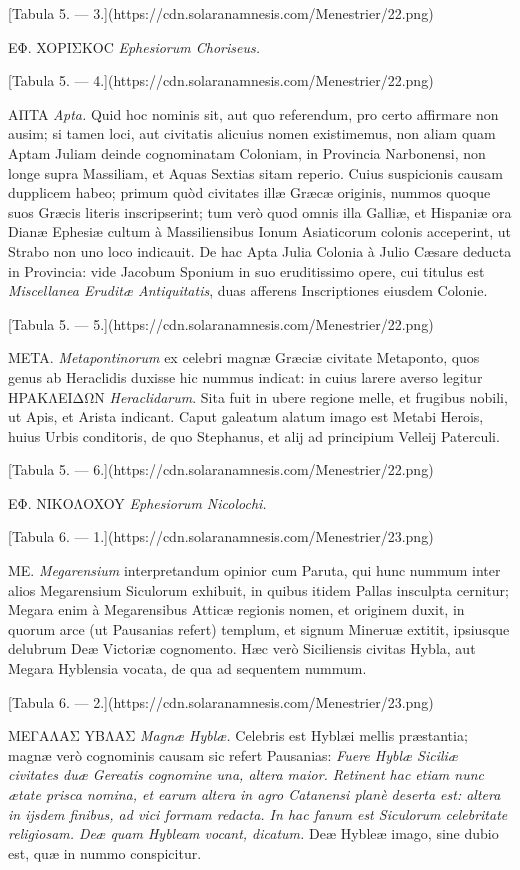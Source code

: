 \documentclass[a4paper, 11pt, oneside, polutonikogreek, latin]{article}
\begin{document}
[Tabula 5. --- 3.](https://cdn.solaranamnesis.com/Menestrier/22.png)

EΦ. XOPIΣKOC \emph{Ephesiorum Choriseus.}

[Tabula 5. --- 4.](https://cdn.solaranamnesis.com/Menestrier/22.png)

AΠTA \emph{Apta.} Quid hoc nominis sit, aut quo referendum, pro certo affirmare non ausim; si tamen loci, aut civitatis alicuius nomen existimemus, non aliam quam Aptam Juliam deinde cognominatam Coloniam, in Provincia Narbonensi, non longe supra Massiliam, et Aquas Sextias sitam reperio. Cuius suspicionis causam dupplicem habeo; primum quòd civitates illæ Græcæ originis, nummos quoque suos Græcis literis inscripserint; tum verò quod omnis illa Galliæ, et Hispaniæ ora Dianæ Ephesiæ cultum à Massiliensibus Ionum Asiaticorum colonis acceperint, ut Strabo non uno loco indicauit. De hac Apta Julia Colonia à Julio Cæsare deducta in Provincia: vide Jacobum Sponium in suo eruditissimo opere, cui titulus est \emph{Miscellanea Eruditæ Antiquitatis}, duas afferens Inscriptiones eiusdem Colonie.

[Tabula 5. --- 5.](https://cdn.solaranamnesis.com/Menestrier/22.png)

META. \emph{Metapontinorum} ex celebri magnæ Græciæ civitate Metaponto, quos genus ab Heraclidis duxisse hic nummus indicat: in cuius larere averso legitur HPAKΛEIΔΩN \emph{Heraclidarum}. Sita fuit in ubere regione melle, et frugibus nobili, ut Apis, et Arista indicant. Caput galeatum alatum imago est Metabi Herois, huius Urbis conditoris, de quo Stephanus, et alij ad principium Velleij Paterculi.

[Tabula 5. --- 6.](https://cdn.solaranamnesis.com/Menestrier/22.png)

EΦ. NIKOΛOXOY \emph{Ephesiorum Nicolochi.}

[Tabula 6. --- 1.](https://cdn.solaranamnesis.com/Menestrier/23.png)

ME. \emph{Megarensium} interpretandum opinior cum Paruta, qui hunc nummum inter alios Megarensium Siculorum exhibuit, in quibus itidem Pallas insculpta cernitur; Megara enim à Megarensibus Atticæ regionis nomen, et originem duxit, in quorum arce (ut Pausanias refert) templum, et signum Mineruæ extitit, ipsiusque delubrum Deæ Victoriæ cognomento. Hæc verò Siciliensis civitas Hybla, aut Megara Hyblensia vocata, de qua ad sequentem nummum.

[Tabula 6. --- 2.](https://cdn.solaranamnesis.com/Menestrier/23.png)

MEΓAΛAΣ YBΛAΣ \emph{Magnæ Hyblæ.} Celebris est Hyblæi mellis præstantia; magnæ verò cognominis causam sic refert Pausanias: \emph{Fuere Hyblæ Siciliæ civitates duæ Gereatis cognomine una, altera maior. Retinent hac etiam nunc ætate prisca nomina, et earum altera in agro Catanensi planè deserta est: altera in ijsdem finibus, ad vici formam redacta. In hac fanum est Siculorum celebritate religiosam. Deæ quam Hybleam vocant, dicatum.} Deæ Hybleæ imago, sine dubio est, quæ in nummo conspicitur.
\end{document}
